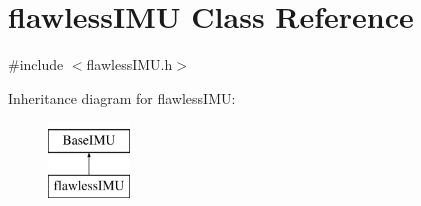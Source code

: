 \hypertarget{classflawless_i_m_u}{}\section{flawless\+I\+MU Class Reference}
\label{classflawless_i_m_u}


{\ttfamily \#include $<$flawless\+I\+M\+U.\+h$>$}

Inheritance diagram for flawless\+I\+MU\+:\begin{figure}[H]
\begin{center}
\leavevmode
\includegraphics[height=2.000000cm]{classflawless_i_m_u}
\end{center}
\end{figure}
